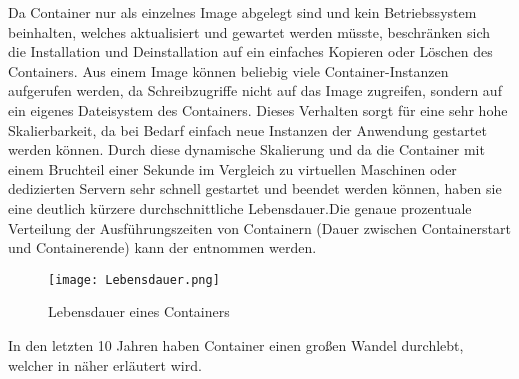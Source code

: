 Da Container nur als einzelnes Image abgelegt sind und kein Betriebssystem beinhalten, welches aktualisiert und gewartet werden müsste, beschränken sich die Installation und Deinstallation auf ein einfaches Kopieren oder Löschen des Containers. 
Aus einem Image können beliebig viele Container-Instanzen aufgerufen werden, da Schreibzugriffe nicht auf das Image zugreifen, sondern auf ein eigenes Dateisystem des Containers. Dieses Verhalten sorgt für eine sehr hohe Skalierbarkeit, da bei Bedarf einfach neue Instanzen der Anwendung gestartet werden können. \citep{12771285120180201}
Durch diese dynamische Skalierung und da die Container mit einem Bruchteil einer Sekunde im Vergleich zu virtuellen Maschinen oder dedizierten Servern sehr schnell gestartet und beendet werden können, haben sie eine deutlich kürzere durchschnittliche Lebensdauer.\newpage Die genaue prozentuale Verteilung der Ausführungszeiten von Containern (Dauer zwischen Containerstart und Containerende) kann der  entnommen werden.
\begin{figure}[H]
	\begin{center}
		\texttt{[image: Lebensdauer.png]}
	\end{center}
	\caption[Lebensdauer eines Containers]{Lebensdauer eines Containers \footnotemark}
	\label{fig:Lebensdauer}
\end{figure}
In den letzten 10 Jahren haben Container einen großen Wandel durchlebt, welcher in  näher erläutert wird.
\newpage